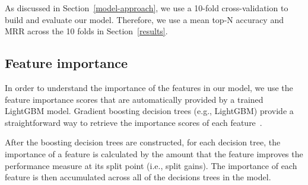 As discussed in Section~\ref{model-approach}, we use a 10-fold cross-validation to build and evaluate our model. 
Therefore, we use a mean top-N accuracy and MRR across the 10 folds in Section~\ref{results}.
 

\subsection{Feature importance}

In order to understand the importance of the features in our model, we use the feature importance scores that are automatically provided by a trained LightGBM model.
Gradient boosting decision trees (e.g., LightGBM) provide a straightforward way to retrieve the importance scores of each feature~\cite{friedman2001elements}.

After the boosting decision trees are constructed, for each decision tree, the importance of a feature is calculated by the amount that the feature improves the performance measure at its split point (i.e., split gains). The importance of each feature is then accumulated across all of the decisions trees in the model.


